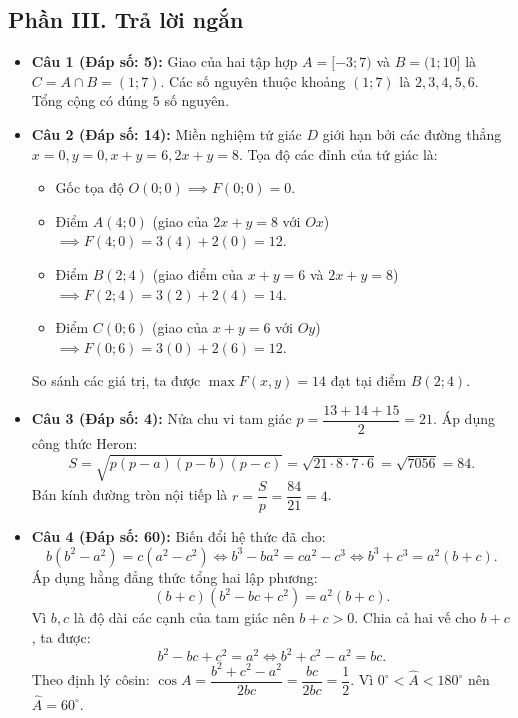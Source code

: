 \documentclass[12pt,a4paper]{article}
\begin{document}
\subsection*{Phần III. Trả lời ngắn}
\begin{itemize}[leftmargin=0.6cm, itemsep=4pt]
\item \textbf{Câu 1 (Đáp số: 5):} Giao của hai tập hợp $A = [-3; 7)$ và $B = (1; 10]$ là $C = A \cap B = (1; 7)$. Các số nguyên thuộc khoảng $(1; 7)$ là $2, 3, 4, 5, 6$. Tổng cộng có đúng $5$ số nguyên.
\item \textbf{Câu 2 (Đáp số: 14):} Miền nghiệm tứ giác $D$ giới hạn bởi các đường thẳng $x = 0, y = 0, x + y = 6, 2x + y = 8$. Tọa độ các đỉnh của tứ giác là:
\begin{itemize}
    \item Gốc tọa độ $O(0; 0) \implies F(0; 0) = 0$.
    \item Điểm $A(4; 0)$ (giao của $2x + y = 8$ với $Ox$) $\implies F(4; 0) = 3(4) + 2(0) = 12$.
    \item Điểm $B(2; 4)$ (giao điểm của $x + y = 6$ và $2x + y = 8$) $\implies F(2; 4) = 3(2) + 2(4) = 14$.
    \item Điểm $C(0; 6)$ (giao của $x + y = 6$ với $Oy$) $\implies F(0; 6) = 3(0) + 2(6) = 12$.
\end{itemize}
So sánh các giá trị, ta được $\max F(x, y) = 14$ đạt tại điểm $B(2; 4)$.
\item \textbf{Câu 3 (Đáp số: 4):} Nửa chu vi tam giác $p = \dfrac{13 + 14 + 15}{2} = 21$.
Áp dụng công thức Heron:
\[
S = \sqrt{p(p-a)(p-b)(p-c)} = \sqrt{21\cdot 8\cdot 7\cdot 6} = \sqrt{7056} = 84.
\]
Bán kính đường tròn nội tiếp là $r = \dfrac{S}{p} = \dfrac{84}{21} = 4$.
\item \textbf{Câu 4 (Đáp số: 60):} Biến đổi hệ thức đã cho:
\[
b(b^2 - a^2) = c(a^2 - c^2) \iff b^3 - ba^2 = ca^2 - c^3 \iff b^3 + c^3 = a^2(b + c).
\]
Áp dụng hằng đẳng thức tổng hai lập phương:
\[
(b + c)(b^2 - bc + c^2) = a^2(b + c).
\]
Vì $b, c$ là độ dài các cạnh của tam giác nên $b + c > 0$. Chia cả hai vế cho $b + c$, ta được:
\[
b^2 - bc + c^2 = a^2 \iff b^2 + c^2 - a^2 = bc.
\]
Theo định lý côsin: $\cos A = \dfrac{b^2 + c^2 - a^2}{2bc} = \dfrac{bc}{2bc} = \dfrac{1}{2}$.
Vì $0^\circ < \widehat{A} < 180^\circ$ nên $\widehat{A} = 60^\circ$.
\end{itemize}
\end{document}
